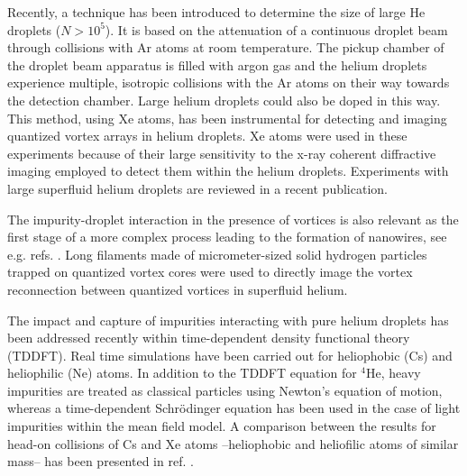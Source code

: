 Recently, a technique has been introduced to determine the size of 
large He droplets ($N> 10^5$). It is based on the attenuation of a continuous  
droplet beam through collisions with Ar atoms at room temperature.\cite{Gom11} 
The pickup chamber of the droplet beam apparatus is filled with argon 
gas and the helium droplets experience multiple, isotropic collisions with the Ar 
atoms on their way towards the detection chamber. 
%
Large helium droplets 
could also be doped in this way. This method, using Xe atoms,
has been instrumental for detecting and imaging quantized vortex 
arrays in helium droplets.\cite{Gom14,Jon16}  Xe 
atoms were used in these experiments because of their large
sensitivity to the x-ray coherent diffractive imaging employed 
to detect them within the helium droplets. Experiments with large superfluid helium droplets 
are reviewed in a recent publication.\cite{Tan17}


The impurity-droplet interaction in the presence of vortices 
is also relevant as the first stage of a more complex process
leading to the 
formation of nanowires, see e.g. refs. \cite{Leb11,Gom12,Lat14,Tha14}.
Long filaments made of micrometer-sized solid hydrogen 
particles trapped on quantized vortex cores
were used to directly image the vortex reconnection
between quantized vortices in superfluid helium.\cite{Bew08}


The impact and capture of impurities  
interacting with pure helium droplets has been addressed recently within time-dependent 
density functional theory (TDDFT).
Real time simulations have been carried out for 
heliophobic\cite{Lea14a} (Cs) and heliophilic\cite{Vil16b} (Ne) atoms. In addition to the 
TDDFT equation for $^4$He, heavy impurities are treated as 
classical particles using
Newton's equation of motion, whereas a time-dependent 
Schr\"odinger equation has been used in the case of  
light impurities within the mean field model.\cite{Her12a,Vil16b}  
A comparison between the results for head-on collisions of Cs and Xe 
atoms --heliophobic and heliofilic atoms of similar mass-- has been presented in ref. \cite{Cop16}.

